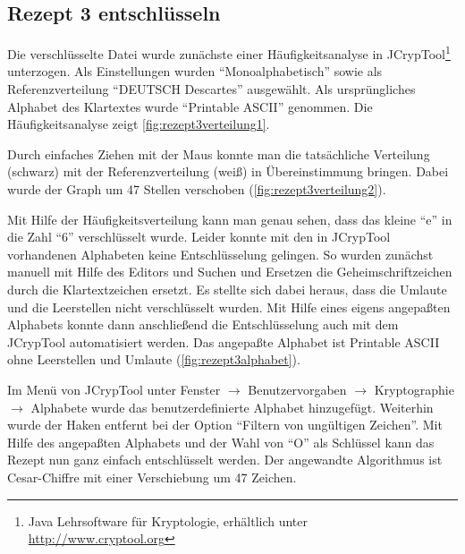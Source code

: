 \subsection{Rezept 3 entschlüsseln}
\label{RezeptDreiEntschluesseln}

Die verschlüsselte Datei wurde zunächste einer Häufigkeitsanalyse in
JCrypTool\footnote{Java Lehrsoftware für Kryptologie, erhältlich unter
  \url{http://www.cryptool.org}} unterzogen. Als Einstellungen wurden
``Monoalphabetisch'' sowie als Referenzverteilung ``DEUTSCH Descartes''
ausgewählt. Als ursprüngliches Alphabet des Klartextes wurde ``Printable ASCII''
genommen. Die Häufigkeitsanalyse zeigt \cref{fig:rezept3verteilung1}.


Durch einfaches Ziehen mit der Maus konnte man die tatsächliche Verteilung
(schwarz) mit der Referenzverteilung (weiß) in Übereinstimmung bringen. Dabei
wurde der Graph um 47 Stellen verschoben (\cref{fig:rezept3verteilung2}).


Mit Hilfe der Häufigkeitsverteilung kann man genau sehen, dass das kleine ``e''
in die Zahl ``6'' verschlüsselt wurde. Leider konnte mit den in JCrypTool
vorhandenen Alphabeten keine Entschlüsselung gelingen. So wurden zunächst
manuell mit Hilfe des Editors und Suchen und Ersetzen die Geheimschriftzeichen
durch die Klartextzeichen ersetzt. Es stellte sich dabei heraus, dass die
Umlaute und die Leerstellen nicht verschlüsselt wurden. Mit Hilfe eines eigens
angepaßten Alphabets konnte dann anschließend die Entschlüsselung auch mit dem
JCrypTool automatisiert werden. Das angepaßte Alphabet ist Printable ASCII ohne
Leerstellen und Umlaute (\cref{fig:rezept3alphabet}).


Im Menü von JCrypTool unter Fenster $\rightarrow$ Benutzervorgaben $\rightarrow$
Kryptographie $\rightarrow$ Alphabete wurde das benutzerdefinierte Alphabet
hinzugefügt. Weiterhin wurde der Haken entfernt bei der Option ``Filtern von
ungültigen Zeichen''.  Mit Hilfe des angepaßten Alphabets und der Wahl von ``O''
als Schlüssel kann das Rezept nun ganz einfach entschlüsselt werden.  Der
angewandte Algorithmus ist Cesar-Chiffre mit einer Verschiebung um 47 Zeichen.

